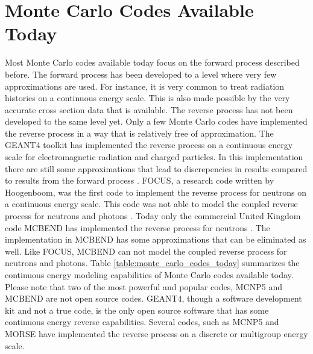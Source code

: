 \section{Monte Carlo Codes Available Today}
\label{sec:monte_carlo_codes}
Most Monte Carlo codes available today focus on the forward process described
before. The forward process has been developed to a level where very few 
approximations are used. For instance, it is very common to treat radiation
histories on a continuous energy scale. This is also made possible by the very
accurate cross section data that is available. The reverse process has not been 
developed to the same level yet. Only a few Monte Carlo codes have implemented
the reverse process in a way that is relatively free of approximation. The
GEANT4 toolkit has implemented the reverse process on a continuous energy 
scale for electromagnetic radiation and charged particles. In this implementation there are still some approximations that lead to discrepencies in results 
compared to results from the forward process 
\citep{desorgher_implementation_2010}. FOCUS, a research code written by 
Hoogenboom, was the first code to implement the reverse process for neutrons
on a continuous energy scale. This code was not able to model the coupled 
reverse process for neutrons and photons \citep{hoogenboom_adjoint_1977}. Today 
only the commercial United Kingdom code MCBEND has implemented the reverse
process for neutrons \citep{grimstone_extension_1998}. The implementation in
MCBEND has some approximations that can be eliminated as well. Like FOCUS, 
MCBEND can not model the coupled reverse process for neutrons and photons. 
Table \ref{table:monte_carlo_codes_today} summarizes the continuous energy 
modeling capabilities of Monte Carlo codes available today. Please note that
two of the most powerful and popular codes, MCNP5 and MCBEND are not open 
source codes. GEANT4, though a software development kit and not a true code,
is the only open source software that has some continuous energy reverse 
capabilities. Several codes, such as MCNP5 and MORSE have implemented the 
reverse process on a discrete or multigroup energy scale.


